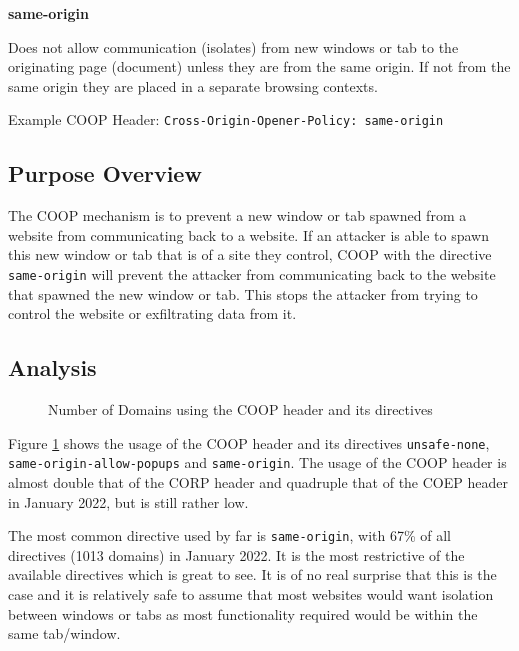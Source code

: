\documentclass{mscreport}
\begin{document}
\vspace{0.7cm} \noindent
\textbf{same-origin}

\vspace{0.3cm} \noindent
Does not allow communication (isolates) from new windows or tab to the originating page (document) unless they are from the same origin. If not from the same origin they are placed in a separate browsing contexts.

\vspace{0.3cm} \noindent
Example COOP Header: \texttt{Cross-Origin-Opener-Policy: same-origin}

\subsection{Purpose Overview}

\noindent
The COOP mechanism is to prevent a new window or tab spawned from a website from communicating back to a website. If an attacker is able to spawn this new window or tab that is of a site they control, COOP with the directive \texttt{same-origin} will prevent the attacker from communicating back to the website that spawned the new window or tab. This stops the attacker from trying to control the website or exfiltrating data from it.

\clearpage
\newpage

\subsection{Analysis}

\begin{figure}[t]
	\begin{center}
		\caption{Number of Domains using the COOP header and its directives}
		\label{fig:coop_overview}
	\end{center}
\end{figure}

\noindent
Figure \ref{fig:coop_overview} shows the usage of the COOP header and its directives \texttt{unsafe-none}, \newline \texttt{same-origin-allow-popups} and \texttt{same-origin}. The usage of the COOP header is almost double that of the CORP header and quadruple that of the COEP header in January 2022, but is still rather low.

\vspace{0.3cm} \noindent
The most common directive used by far is \texttt{same-origin}, with 67\% of all directives (1013 domains) in January 2022. It is the most restrictive of the available directives which is great to see. It is of no real surprise that this is the case and it is relatively safe to assume that most websites would want isolation between windows or tabs as most functionality required would be within the same tab/window.
\end{document}
